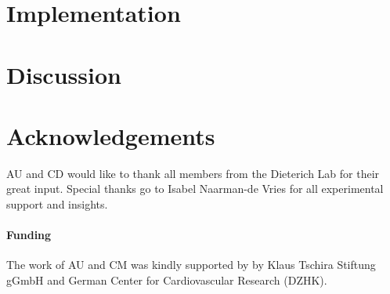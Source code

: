 \documentclass{bioinfo}
\begin{document}
\section*{Implementation}

\section*{Discussion}

\section*{Acknowledgements}
AU and CD would like to thank all members from the Dieterich Lab for their great input.
Special thanks go to Isabel Naarman-de Vries for all experimental support and insights.
\paragraph{Funding\textcolon} 
The work of AU and CM was kindly supported by
by Klaus Tschira Stiftung gGmbH and German Center for Cardiovascular Research (DZHK).

%
%
%
%
%
%
%

\end{document}
